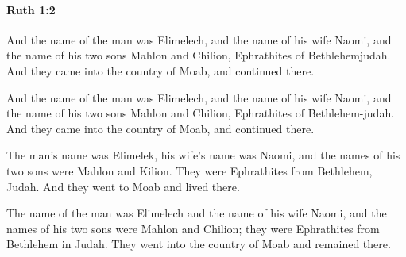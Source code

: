 		\paragraph{Ruth 1:2} %
			\label{RUTH-1-2}

			And the name of the man was Elimelech, and the name of his wife Naomi, and the name of his two sons Mahlon and Chilion, Ephrathites of Bethlehemjudah. And they came into the country of Moab, and continued there.

			\begin{versebox}
					\item[BHS] 
					\item[LXX] 
					\item[ASV] And the name of the man was Elimelech, and the name of his wife Naomi, and the name of his two sons Mahlon and Chilion, Ephrathites of Bethlehem-judah. And they came into the country of Moab, and continued there.
					\item[NIV] The man’s name was Elimelek, his wife’s name was Naomi, and the names of his two sons were Mahlon and Kilion. They were Ephrathites from Bethlehem, Judah. And they went to Moab and lived there.
					\item[NRSV] The name of the man was Elimelech and the name of his wife Naomi, and the names of his two sons were Mahlon and Chilion; they were Ephrathites from Bethlehem in Judah. They went into the country of Moab and remained there.
			\end{versebox}

